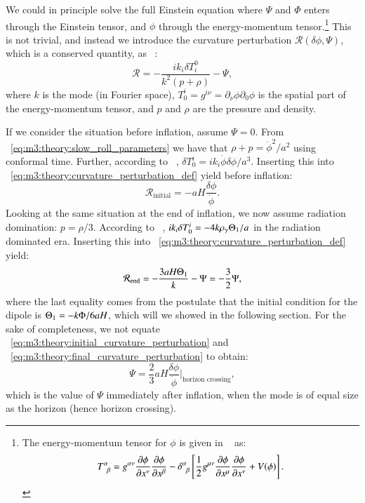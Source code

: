 
    We could in principle solve the full Einstein equation where $\Psi$ and $\Phi$ enters through the Einstein tensor, and $\phi$ through the energy-momentum tensor.\footnote{The energy-momentum tensor for $\phi$ is given in ~\cite[Eq. 7.6]{dodelson2020modern} as: $$ T^\alpha_{\;\;\beta}=g^{\alpha\nu}\pdv{\phi}{x^\nu}\pdv{\phi}{x^\beta}-\delta^\alpha_{\;\;\beta}\left[\frac{1}{2}g^{\mu\nu}\pdv{\phi}{x^\mu}\pdv{\phi}{x^\nu}+V(\phi)\right]. $$} This is not trivial, and instead we introduce the curvature perturbation $\mathcal{R}(\delta\phi, \Psi)$, which is a conserved quantity, as ~\cite{dodelson2020modern}:
    \begin{equation}\label{eq:m3:theory:curvature_perturbation_def}
        \mathcal{R} = -\frac{ik_i\delta T^0_i}{k^2(p+\rho)}-\Psi,
    \end{equation}
    where $k$ is the mode (in Fourier space), $T^i_0 = g^{i\nu}=\partial_\nu\phi\partial_0\phi$ is the spatial part of the energy-momentum tensor, and $p$ and $\rho$ are the pressure and density. 

    If we consider the situation before inflation, assume $\Psi=0$. From ~\cref{eq:m3:theory:slow_roll_parameters} we have that $\rho+p=\dot{\phi}^2/a^2$ using conformal time. Further, according to ~\cite[Eq. 7.47]{dodelson2020modern}, $\delta T^i_0=ik_i\dot{\phi}\delta\phi/a^3$. Inserting this into ~\cref{eq:m3:theory:curvature_perturbation_def} yield before inflation:
    \begin{equation}\label{eq:m3:theory:initial_curvature_perturbation}
        \mathcal{R}_\mathrm{initial} = -aH\frac{\delta\phi}{\dot{\phi}}.
    \end{equation}
    Looking at the same situation at the end of inflation, we now assume radiation domination: $p=\rho/3$. According to ~\cite{dodelson2020modern}, $ik_i\delta T^i_0 = -4k\rho_\gamma\Theta_1/a$ in the radiation dominated era. Inserting this into ~\cref{eq:m3:theory:curvature_perturbation_def} yield:
    \begin{equation}\label{eq:m3:theory:final_curvature_perturbation}
        \mathcal{R}_\mathrm{end} = -\frac{3aH\Theta_1}{k}-\Psi = -\frac{3}{2}\Psi,
    \end{equation}
    where the last equality comes from the postulate that the initial condition for the dipole is $\Theta_1=-k\Phi/6aH$, which will we showed in the following section. For the sake of completeness, we not equate ~\cref{eq:m3:theory:initial_curvature_perturbation} and ~\cref{eq:m3:theory:final_curvature_perturbation} to obtain:
    \begin{equation}\label{eq:m3:theory:final_Psi_after_inflation}
        \Psi = \frac{2}{3}aH\frac{\delta\phi}{\dot{\phi}}\Big|_\text{horizon crossing},
    \end{equation}
    which is the value of $\Psi$ immediately after inflation, when the mode is of equal size as the horizon (hence horizon crossing). 
